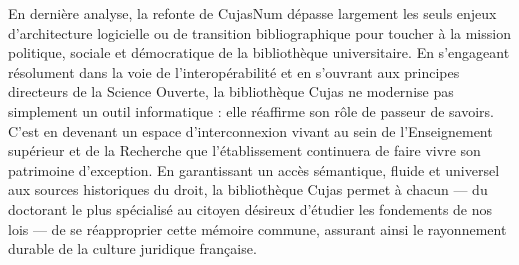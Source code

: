 En dernière analyse, la refonte de CujasNum dépasse largement les seuls enjeux d'architecture logicielle ou de transition bibliographique pour toucher à la mission politique, sociale et démocratique de la bibliothèque universitaire. En s'engageant résolument dans la voie de l'interopérabilité et en s'ouvrant aux principes directeurs de la Science Ouverte, la bibliothèque Cujas ne modernise pas simplement un outil informatique : elle réaffirme son rôle de passeur de savoirs. C'est en devenant un espace d'interconnexion vivant au sein de l'Enseignement supérieur et de la Recherche que l'établissement continuera de faire vivre son patrimoine d'exception. En garantissant un accès sémantique, fluide et universel aux sources historiques du droit, la bibliothèque Cujas permet à chacun — du doctorant le plus spécialisé au citoyen désireux d'étudier les fondements de nos lois — de se réapproprier cette mémoire commune, assurant ainsi le rayonnement durable de la culture juridique française.